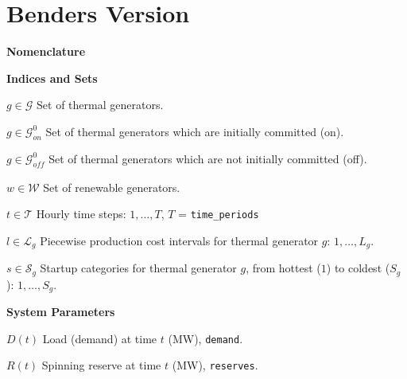 \documentclass[a4paper,12pt]{article}
\newcommand{\cG}{\mathcal{G}}
\newcommand{\cT}{\mathcal{T}}
\newcommand{\cW}{\mathcal{W}}
\newcommand{\cL}{\mathcal{L}}
\newcommand{\cS}{\mathcal{S}}
\begin{document}
\section*{Benders Version}


\newcommand{\bbR}{{\mathbb R}}
\newcommand{\uP}{\underline{P}}
\newcommand{\oP}{\overline{P}}

\newcommand\mydescriptionopt{
	\IEEEsetlabelwidth{$g \in \cG_{\textit{off}}^0$]}
	\IEEEusemathlabelsep
}

\textbf{Nomenclature}

\textbf{Indices and Sets}
\begin{IEEEdescription}[\mydescriptionopt] 
	\item[$g \in \cG$] Set of thermal generators.
	\item[$g \in \cG_{\textit{on}}^0$] Set of thermal generators which are initially committed (on).
	\item[$g \in \cG_{\textit{off}}^0$] Set of thermal generators which are not initially committed (off).
	\item[$w \in \cW$] Set of renewable generators.
	\item[$t \in \cT$] Hourly time steps: $1, \ldots, T$, $T$ = {\tt time\_periods}
	\item[$l \in \cL_g$] Piecewise production cost intervals for thermal generator $g$: $1, \ldots, L_g$.
	\item[$s \in \cS_g$] Startup categories for thermal generator $g$, from hottest ($1$) to coldest ($S_g$): $1, \ldots, S_g$.
\end{IEEEdescription}

\textbf{System Parameters}
\begin{IEEEdescription}[\mydescriptionopt]
	\item[$D(t)$]    Load (demand) at time $t$ (MW), {\tt demand}.
	\item[$R(t)$]    Spinning reserve at time $t$ (MW), {\tt reserves}.
\end{IEEEdescription}
\end{document}
